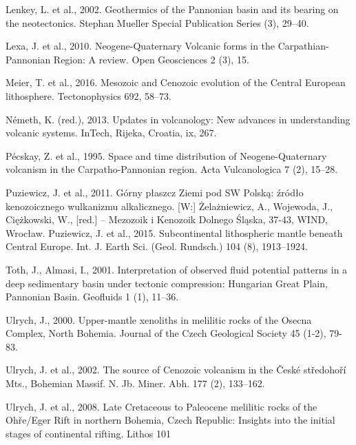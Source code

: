 \documentclass[11.5pt,twoside]{report}
\begin{document}
\begin{multicols}{3}
Lenkey, L. et al., 2002. Geothermics of the Pannonian basin and its bearing on the neotectonics. Stephan Mueller Special Publication Series (3), 29–40.

Lexa, J. et al., 2010. Neogene-Quaternary Volcanic forms in the Carpathian-Pannonian Region: A review. Open Geosciences 2 (3), 15.

Meier, T. et al., 2016. Mesozoic and Cenozoic evolution of the Central European lithosphere. Tectonophysics 692, 58–73.

Németh, K. (red.), 2013. Updates in volcanology: New advances in understanding volcanic systems. InTech, Rijeka, Croatia, ix, 267.

Pécskay, Z. et al., 1995. Space and time distribution of Neogene-Quaternary volcanism in the Carpatho-Pannonian region. Acta Vulcanologica 7 (2), 15–28.

Puziewicz, J. et al., 2011. Górny płaszcz Ziemi pod SW Polską: źródło kenozoicznego wulkanizmu alkalicznego. [W:] Żelażniewicz, A., Wojewoda, J., Ciężkowski, W., [red.] – Mezozoik i Kenozoik Dolnego Śląska, 37-43, WIND, Wrocław.
Puziewicz, J. et al., 2015. Subcontinental lithospheric mantle beneath Central Europe. Int. J. Earth Sci. (Geol. Rundsch.) 104 (8), 1913–1924. 

Toth, J., Almasi, I., 2001. Interpretation of observed fluid potential patterns in a deep sedimentary basin under tectonic compression: Hungarian Great Plain, Pannonian Basin. Geofluids 1 (1), 11–36. 

Ulrych, J., 2000. Upper-mantle xenoliths in melilitic rocks of the Osecna Complex, North Bohemia. Journal of the Czech Geological Society 45 (1-2), 79-83.

Ulrych, J. et al., 2002. The source of Cenozoic volcanism in the České středohoří Mts., Bohemian Massif. N. Jb. Miner. Abh. 177 (2), 133–162. 

Ulrych, J. et al., 2008. Late Cretaceous to Paleocene melilitic rocks of the Ohře/Eger Rift in northern Bohemia, Czech Republic: Insights into the initial stages of continental rifting. Lithos 101 

\endgroup

\end{multicols}
\end{document}
